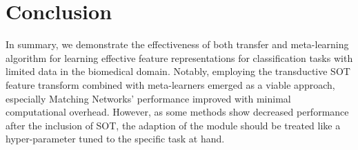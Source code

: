 \section{Conclusion}

In summary, we demonstrate the effectiveness of both transfer and meta-learning algorithm for learning effective feature representations for classification tasks with limited data in the biomedical domain. 
Notably, employing the transductive SOT feature transform combined with meta-learners emerged as a viable approach, especially Matching Networks' performance improved with minimal computational overhead. However, as some methods show decreased performance after the inclusion of SOT, the adaption of the module should be treated like a hyper-parameter tuned to the specific task at hand.